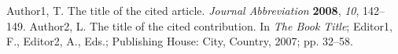 \documentclass[sensors,article,submit,moreauthors,pdftex]{Definitions/mdpi}
\begin{document}
%



%

\begin{thebibliography}{999}
Author1, T. The title of the cited article. {\em Journal Abbreviation} {\bf 2008}, {\em 10}, 142--149.
Author2, L. The title of the cited contribution. In {\em The Book Title}; Editor1, F., Editor2, A., Eds.; Publishing House: City, Country, 2007; pp. 32--58.
\end{thebibliography}
\end{document}
